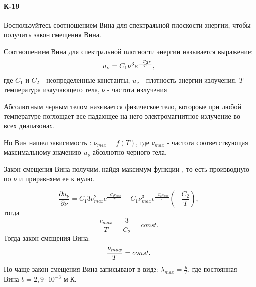 \documentclass[__main__.tex]{subfiles}
\begin{document}
\paragraph{К-19}
Воспользуйтесь соотношением Вина для спектральной плоскости энергии, чтобы получить закон смещения Вина.
\begin{definition}
	Соотношением Вина для спектральной плотности энергии называется выражение: 
	\begin{gather}
	\llabel{29/1}
          u_{\nu}=C_{1}\nu^{3}e^{\frac{-C_{2}\nu}{T}},
	\end{gather}
где $C_{1}$ и $C_{2}$ - неопределенные константы, $u_{\nu}$ - плотность энергии излучения, $T$ - температура излучающего тела, $\nu$ - частота излучения
\end{definition}

\begin{definition}
	Абсолютным черным телом называется физическое тело, котороые при любой температуре поглощает все падающее на него электромагнитное излучение во всех диапазонах.
\end{definition}
Но Вин нашел зависимость : $\nu_{max} = f(T)$, где $\nu_{max}$ - частота соответствующая максимальному значению $u_{\nu}$ абсолютно черного тела.

Закон смещения Вина получим, найдя максимум функции , то есть производную по $\nu$ и приравняем ее к нулю.

$$
   \frac {\partial u_{\nu}}{\partial \nu}= C_{1}3\nu_{max}^{2}e^{\frac{-C_{2}\nu_{max}}{T}}+
   C_{1}\nu_{max}^{3}e^{\frac{-C_{2}\nu_{max}}{T}}(-\frac{C_{2}}{T}),
$$
тогда
$$
    \frac{\nu_{max}}{T}=\frac{3}{C_{2}}=const.
$$
Тогда закон смещения Вина:
\begin{gather}
\llabel{goof}
            \frac{\nu_{max}}{T}=const.
\end{gather}
Но чаще закон смещения Вина записывают в виде: $\lambda_{max}=\frac{b}{T}$, где постоянная Вина $b=2,9\cdot10^{-3}$ м$\cdot$К. 
\end{document}
